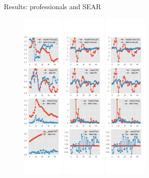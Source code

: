 \documentclass{beamer}
\begin{document}
\begin{frame}{Results: professionals and SEAR}
\begin{figure}[ht]
		\includegraphics[width=0.19\textwidth, height = \0.95\textheight]{figures/spf_se_est_diag2.png}
		\includegraphics[width=0.19\textwidth, height = \0.95\textheight]{figures/spf_se_est_diag3.png}
		\includegraphics[width=0.19\textwidth, height = \0.95\textheight]{figures/spf_se_est_diag4.png}
\end{figure}
\end{frame}
\end{document}

